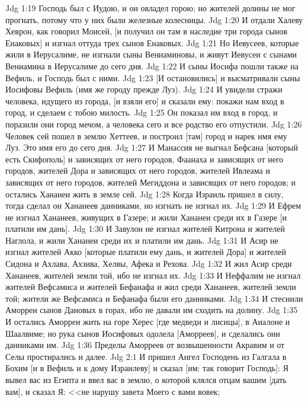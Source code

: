 \rsbpar\vs Jdg 1:19 Господь был с Иудою, и он овладел горою; но жителей долины не мог прогнать, потому что у них были железные колесницы.
\vs Jdg 1:20 И отдали Халеву Хеврон, как говорил Моисей, [и получил он там в наследие три города сынов Енаковых] и изгнал оттуда трех сынов Енаковых.
\vs Jdg 1:21 Но Иевусеев, которые жили в Иерусалиме, не изгнали сыны Вениаминовы, и живут Иевусеи с сынами Вениамина в Иерусалиме до сего дня.
\vs Jdg 1:22 И сыны Иосифа пошли также на Вефиль, и Господь был с ними.
\vs Jdg 1:23 [И остановились] и высматривали сыны Иосифовы Вефиль (имя же городу  прежде Луз).
\vs Jdg 1:24 И увидели стражи человека, идущего из города, [и взяли его] и сказали ему: покажи нам вход в город, и сделаем с тобою милость.
\vs Jdg 1:25 Он показал им вход в город, и поразили они город мечом, а человека сего и все родство его отпустили.
\vs Jdg 1:26 Человек сей пошел в землю Хеттеев, и построил [там] город и нарек имя ему Луз. Это имя его до сего дня.
\vs Jdg 1:27 И Манассия не выгнал  Бефсана [который есть Скифополь] и зависящих от него городов, Фаанаха и зависящих от него городов, жителей Дора и зависящих от него городов, жителей Ивлеама и зависящих от него городов, жителей Мегиддона и зависящих от него городов; и остались Хананеи жить в земле сей.
\vs Jdg 1:28 Когда Израиль пришел в силу, тогда сделал он Хананеев данниками, но изгнать не изгнал их.
\vs Jdg 1:29 И Ефрем не изгнал Хананеев, живущих в Газере; и жили Хананеи среди их в Газере [и платили им дань].
\vs Jdg 1:30 И Завулон не изгнал жителей Китрона и жителей Наглола, и жили Хананеи среди их и платили им дань.
\vs Jdg 1:31 И Асир не изгнал жителей Акко [которые платили ему дань, и жителей Дора] и жителей Сидона и Ахлава, Ахзива, Хелвы, Афека и Рехова.
\vs Jdg 1:32 И жил Асир среди Хананеев, жителей земли той, ибо не изгнал их.
\vs Jdg 1:33 И Неффалим не изгнал жителей Вефсамиса и жителей Бефанафа и жил среди Хананеев, жителей земли той; жители же Вефсамиса и Бефанафа были его данниками.
\vs Jdg 1:34 И стеснили Аморреи сынов Дановых в горах, ибо не давали им сходить на долину.
\vs Jdg 1:35 И остались Аморреи жить на горе Херес [где медведи и лисицы], в Аиалоне и Шаалвиме; но рука сынов Иосифовых одолела [Аморреев], и сделались они данниками им.
\vs Jdg 1:36 Пределы Аморреев от возвышенности Акравим и от Селы простирались и далее.
\vs Jdg 2:1 И пришел Ангел Господень из Галгала в Бохим [и в Вефиль и к дому Израилеву] и сказал [им: так говорит Господь]: Я вывел вас из Египта и ввел вас в землю, о которой клялся отцам вашим [дать вам], и сказал Я: <<не нарушу завета Моего с вами вовек;
